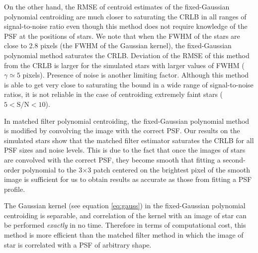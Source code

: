 On the other hand, the RMSE of centroid estimates of the fixed-Gaussian polynomial centroiding are much closer to saturating the CRLB in all ranges of signal-to-noise ratio even though this method does not require knowledge of the PSF at the positions of stars. We note that when the FWHM of the stars are close to 2.8 pixels (the FWHM of the Gaussian kernel), the fixed-Gaussian polynomial method saturates the CRLB. Deviation of the RMSE of this method from the CRLB is larger for the simulated stars with larger values of FWHM ($\gamma \simeq 5$ pixels). Presence of noise is another limiting factor.
Although this method is able to get very close to saturating the bound in a wide range of
signal-to-noise ratios, it is not reliable in the case of centroiding extremely faint stars ($5<\mathrm{S/N}<10$).


In matched filter polynomial centroiding, the fixed-Gaussian polynomial method is modified by convolving the image with the correct PSF. Our results on the simulated stars show that the matched filter estimator saturates the CRLB for all PSF sizes and noise levels.  
This is due to the fact that once the images of stars are convolved with the correct PSF, they become smooth that fitting a second-order polynomial to the 3$\times$3 patch centered on the brightest pixel of the smooth image is sufficient for us to obtain results as accurate as those from fitting a PSF profile. 

The Gaussian kernel (see equation \ref{eq:gauss}) in the fixed-Gaussian polynomial centroiding is separable, and correlation of the kernel with an image of star can be performed \emph{exactly} in no time. Therefore in terms of computational cost, this method is more efficient than the matched filter method in which the image of star is correlated with a PSF of arbitrary shape. 

